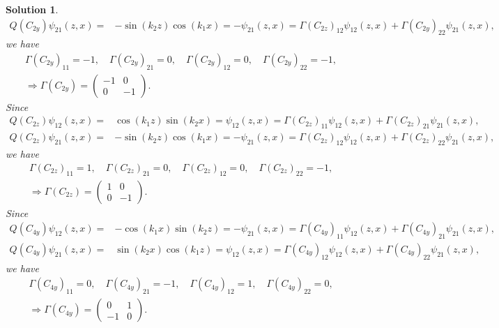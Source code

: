 \documentclass[UTF8,10pt,a4paper]{article}
\theoremstyle{Problem}
\theoremstyle{Solution}
\newtheorem*{sol}{Solution}
\begin{document}
\begin{sol}
\begin{align}
        Q(C_{2y})\psi_{21}(z,x)=&-\sin(k_2z)\cos(k_1x)=-\psi_{21}(z,x)=\Gamma(C_{2z})_{12}\psi_{12}(z,x)+\Gamma(C_{2y})_{22}\psi_{21}(z,x),
    \end{align}
    we have
    \begin{gather}
        \Gamma(C_{2y})_{11}=-1,\quad\Gamma(C_{2y})_{21}=0,\quad\Gamma(C_{2y})_{12}=0,\quad\Gamma(C_{2y})_{22}=-1,\\
        \Longrightarrow\Gamma(C_{2y})=\left(\begin{matrix}
            -1&0\\
            0&-1
        \end{matrix}\right).
    \end{gather}
    Since
    \begin{align}
        Q(C_{2z})\psi_{12}(z,x)=&\cos(k_1z)\sin(k_2x)=\psi_{12}(z,x)=\Gamma(C_{2z})_{11}\psi_{12}(z,x)+\Gamma(C_{2z})_{21}\psi_{21}(z,x),\\
        Q(C_{2z})\psi_{21}(z,x)=&-\sin(k_2z)\cos(k_1x)=-\psi_{21}(z,x)=\Gamma(C_{2z})_{12}\psi_{12}(z,x)+\Gamma(C_{2z})_{22}\psi_{21}(z,x),
    \end{align}
    we have
    \begin{gather}
        \Gamma(C_{2z})_{11}=1,\quad\Gamma(C_{2z})_{21}=0,\quad\Gamma(C_{2z})_{12}=0,\quad\Gamma(C_{2z})_{22}=-1,\\
        \Longrightarrow\Gamma(C_{2z})=\left(\begin{matrix}
            1&0\\
            0&-1
        \end{matrix}\right).
    \end{gather}
    Since
    \begin{align}
        Q(C_{4y})\psi_{12}(z,x)=&-\cos(k_1x)\sin(k_2z)=-\psi_{21}(z,x)=\Gamma(C_{4y})_{11}\psi_{12}(z,x)+\Gamma(C_{4y})_{21}\psi_{21}(z,x),\\
        Q(C_{4y})\psi_{21}(z,x)=&\sin(k_2x)\cos(k_1z)=\psi_{12}(z,x)=\Gamma(C_{4y})_{12}\psi_{12}(z,x)+\Gamma(C_{4y})_{22}\psi_{21}(z,x),
    \end{align}
    we have
    \begin{gather}
        \Gamma(C_{4y})_{11}=0,\quad\Gamma(C_{4y})_{21}=-1,\quad\Gamma(C_{4y})_{12}=1,\quad\Gamma(C_{4y})_{22}=0,\\
        \Longrightarrow\Gamma(C_{4y})=\left(\begin{matrix}
            0&1\\
            -1&0
        \end{matrix}\right).

\end{gather}
\end{sol}
\end{document}
